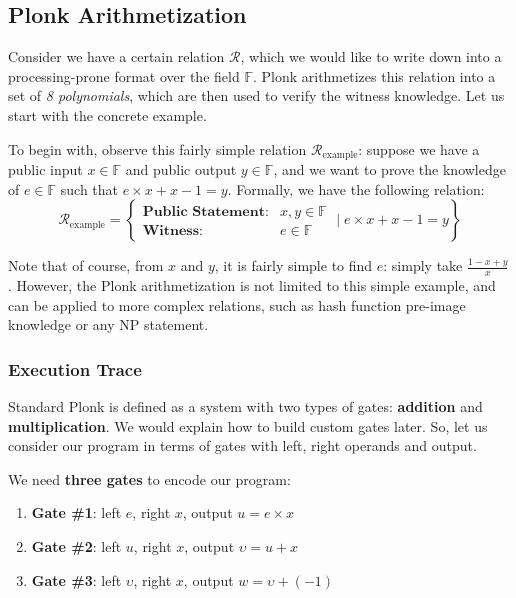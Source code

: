 \documentclass[../lecture-notes.tex]{subfiles}
\begin{document}
\subsection{Plonk Arithmetization}

Consider we have a certain relation $\mathcal{R}$, which we would like to write
down into a processing-prone format over the field $\mathbb{F}$. Plonk arithmetizes this relation into a set
of \textit{8 polynomials}, which are then used to verify the witness knowledge. Let us 
start with the concrete example.

\begin{example}
To begin with, observe this fairly simple relation
$\mathcal{R}_{\text{example}}$: suppose we have a public input $x \in
\mathbb{F}$ and public output $y \in \mathbb{F}$, and we want to prove the knowledge of $e \in
\mathbb{F}$ such that $e \times x + x - 1 = y$. Formally, we have the following relation:
\begin{equation*}
    \mathcal{R}_{\text{example}} = \left\{ \begin{matrix}
        \textbf{Public Statement:} & x, y \in \mathbb{F} \\
        \textbf{Witness}: & e \in \mathbb{F}
    \end{matrix} \; \Big| \; e \times x + x - 1 = y \right\}
\end{equation*}

\end{example}

\begin{remark}
    Note that of course, from $x$ and $y$, it is fairly simple to find $e$: simply take $\frac{1 - x + y}{x}$. However, the Plonk arithmetization 
    is not limited to this simple example, and can be applied to more complex relations, such as hash function pre-image knowledge or any NP statement.
\end{remark}

\subsubsection{Execution Trace}

Standard Plonk is defined as a system with two types of gates: \textbf{addition}
and \textbf{multiplication}. We would explain how to build custom gates later.
So, let us consider our program in terms of gates with left, right operands and
output. 

\begin{example}
    We need \textbf{three gates} to encode our program:
    \begin{enumerate}
        \item \textbf{Gate \#1}: left $e$, right $x$, output \(u = e \times x\)
        \item \textbf{Gate \#2}: left $u$, right $x$, output \(\upsilon = u + x\)
        \item \textbf{Gate \#3}: left $\upsilon$, right $x$, output \(w = \upsilon + (-1)\)
    \end{enumerate}
\end{example}
\end{document}

